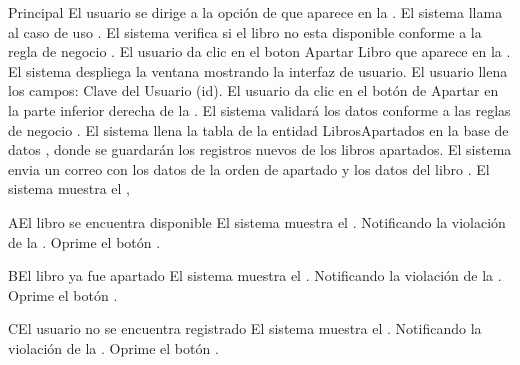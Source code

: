 	\begin{UCtrayectoria}{Principal}
		\UCpaso[\UCactor] El usuario se dirige a la opción de  que aparece en la .
		\UCpaso[\UCsist] El sistema llama al caso de uso .
		\UCpaso[\UCsist] El sistema verifica si el libro no esta disponible conforme a la regla de negocio .
		\UCpaso[\UCactor] El usuario da clic en el boton Apartar Libro que aparece en la .
		\UCpaso[\UCsist] El sistema despliega la ventana  mostrando la interfaz de usuario.
		\UCpaso[\UCactor] El usuario llena los campos: Clave del Usuario (id).
		\UCpaso[\UCactor] El usuario da clic en el botón de Apartar en la parte inferior derecha de la .
		\UCpaso[\UCsist] El sistema validará los datos conforme a las reglas de negocio  .
		\UCpaso[\UCsist] El sistema llena la tabla de la entidad LibrosApartados en la base de datos , donde se guardarán los registros nuevos de los libros apartados. 
		\UCpaso[\UCsist] El sistema envia un correo con los datos de la orden de apartado y los datos del libro .		
		\UCpaso[\UCsist] El sistema muestra el ,
	\end{UCtrayectoria}
		\begin{UCtrayectoriaA}{A}{El libro se encuentra disponible}
			\UCpaso[\UCsist] El sistema muestra el . Notificando la violación de la .
			\UCpaso[\UCactor] Oprime el botón .
		\end{UCtrayectoriaA}		
		\begin{UCtrayectoriaA}{B}{El libro ya fue apartado}
			\UCpaso[\UCsist] El sistema muestra el . Notificando la violación de la .
			\UCpaso[\UCactor] Oprime el botón .
		\end{UCtrayectoriaA}
		
		\begin{UCtrayectoriaA}{C}{El usuario no se encuentra registrado}
			\UCpaso[\UCsist] El sistema muestra el . Notificando la violación de la .
			\UCpaso[\UCactor] Oprime el botón .
		\end{UCtrayectoriaA}
		
